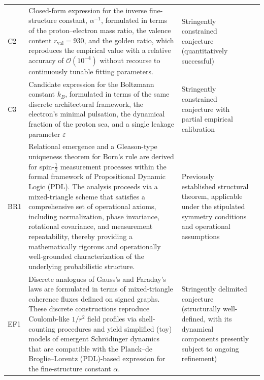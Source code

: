 \documentclass{article}
\begin{document}
\begin{longtable}{@{}p{0.7cm}p{7cm}L{5.6cm}p{2cm}@{}}
  C2 &
  Closed-form expression for the inverse fine-structure constant, $\alpha^{-1}$, formulated in terms of the proton–electron mass ratio, the valence content $r_{\mathrm{val}} = 930$, and the golden ratio, which reproduces the empirical value with a relative accuracy of $\mathcal{O}(10^{-4})$ without recourse to continuously tunable fitting parameters. &
  Stringently constrained conjecture (quantitatively successful) & \cite{Alpha_PDL_v2_2026,PDL_intro,Born_Golden_v2_2026} \\[0.4em]

  C3 &
  Candidate expression for the Boltzmann constant $k_B$, formulated in terms of the same discrete architectural framework, the electron’s minimal pulsation, the dynamical fraction of the proton sea, and a single leakage parameter $\varepsilon$ &
  Stringently constrained conjecture with partial empirical calibration & \cite{PDL_Main_2026,PDL_position,Coherence_Leakage_18_2026} \\[0.4em]

  BR1 & 
  Relational emergence and a Gleason-type uniqueness theorem for Born’s rule are derived for spin-$\tfrac{1}{2}$ measurement processes within the formal framework of Propositional Dynamic Logic (PDL). The analysis proceeds via a mixed-triangle scheme that satisfies a comprehensive set of operational axioms, including normalization, phase invariance, rotational covariance, and measurement repeatability, thereby providing a mathematically rigorous and operationally well-grounded characterization of the underlying probabilistic structure. & 
  Previously established structural theorem, applicable under the stipulated symmetry conditions and operational assumptions & \cite{Gleason_PDL_2026,Golden_Ratio_Sketch_2026} \\[0.4em] 
  
  EF1 & 
  Discrete analogues of Gauss’s and Faraday’s laws are formulated in terms of mixed-triangle coherence fluxes defined on signed graphs. These discrete constructions reproduce Coulomb-like $1/r^{2}$ field profiles via shell-counting procedures and yield simplified (toy) models of emergent Schrödinger dynamics that are compatible with the Planck–de Broglie–Lorentz (PDL)-based expression for the fine-structure constant $\alpha$. &
  Stringently delimited conjecture (structurally well-defined, with its dynamical components presently subject to ongoing refinement) &  \cite{Effective_Fields_PDL_2026,Coherence_Leakage_18_2026} \\[0.4em]


\end{longtable}
\end{document}
